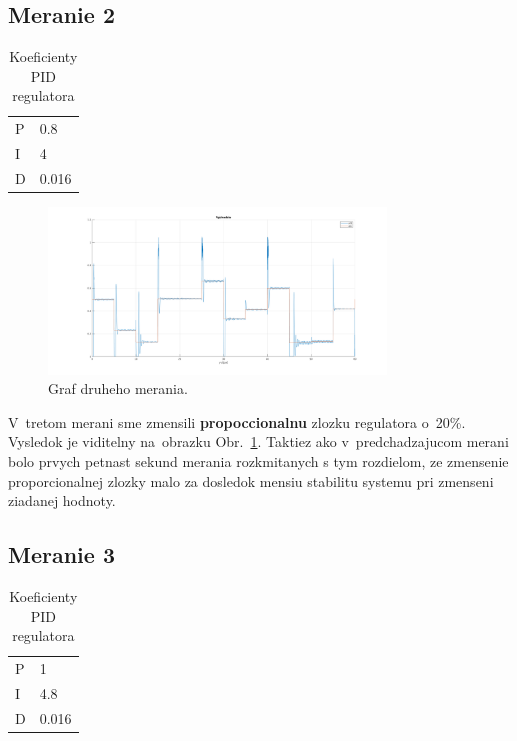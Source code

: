 \documentclass{article}
\begin{document}
\subsection{Meranie 2}
\label{sec:meranie2}

\begin{table}[!htbp]
	\caption{Koeficienty PID regulatora}
	\label{tab:t2}
	\begin{center}
		\begin{tabular}[c]{|l|l|}
			\hline
			P & 0.8 \\
			I & 4 \\
			D & 0.016 \\
			\hline
		\end{tabular}
	\end{center}
\end{table}

\begin{figure}[!htbp]
	\begin{center}
		\includegraphics[width=0.8\textwidth]{./include/m3.png}
	\end{center}
	\caption{Graf druheho merania.}
	\label{fig:meranie2}
\end{figure}

V~tretom merani sme zmensili \textbf{propoccionalnu} zlozku regulatora o~20\%. Vysledok je viditelny
na~obrazku Obr.~\ref{fig:meranie2}. Taktiez ako v~predchadzajucom merani bolo prvych petnast sekund
merania rozkmitanych s tym rozdielom, ze zmensenie proporcionalnej zlozky malo za dosledok mensiu
stabilitu systemu pri zmenseni ziadanej hodnoty.

\clearpage

\subsection{Meranie 3}
\label{sec:meranie3}

\begin{table}[!htbp]
	\caption{Koeficienty PID regulatora}
	\label{tab:t3}
	\begin{center}
		\begin{tabular}[c]{|l|l|}
			\hline
			P & 1 \\
			I & 4.8 \\
			D & 0.016 \\
			\hline
		\end{tabular}
	\end{center}
\end{table}
\end{document}
